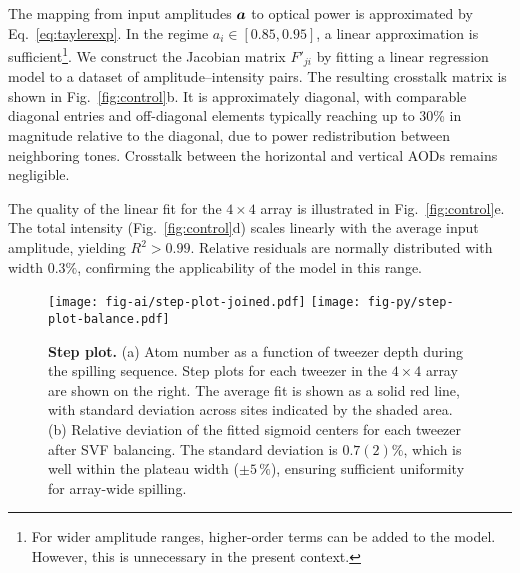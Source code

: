The mapping from input amplitudes $\boldsymbol{a}$ to optical power is approximated by Eq.~\eqref{eq:taylerexp}. In the regime $a_i \in [0.85, 0.95]$, a linear approximation is sufficient\footnote{
    For wider amplitude ranges, higher-order terms can be added to the model. However, this is unnecessary in the present context.
}. We construct the Jacobian matrix $F'_{ji}$ by fitting a linear regression model to a dataset of amplitude–intensity pairs. The resulting crosstalk matrix is shown in Fig.~\ref{fig:control}b. It is approximately diagonal, with comparable diagonal entries and off-diagonal elements typically reaching up to 30\% in magnitude relative to the diagonal, due to power redistribution between neighboring tones. Crosstalk between the horizontal and vertical AODs remains negligible.

The quality of the linear fit for the $4 \times 4$ array is illustrated in Fig.~\ref{fig:control}e. The total intensity (Fig.~\ref{fig:control}d) scales linearly with the average input amplitude, yielding $R^2 > 0.99$. Relative residuals are normally distributed with width $0.3\%$, confirming the applicability of the model in this range.



\begin{figure}
    \centering
    \texttt{[image: fig-ai/step-plot-joined.pdf]}
    \phantom{42}
    \texttt{[image: fig-py/step-plot-balance.pdf]} %
    \caption{
        \textbf{Step plot.}
        (a) 
        Atom number as a function of tweezer depth during the spilling sequence. 
        Step plots for each tweezer in the $4 \times 4$ array are shown on the right. The average fit is shown as a solid red line, with standard deviation across sites indicated by the shaded area. 
        (b) Relative deviation of the fitted sigmoid centers for each tweezer after SVF balancing. The standard deviation is $0.7(2)\%$, which is well within the plateau width ($\pm 5\,\%$), ensuring sufficient uniformity for array-wide spilling. 
    }
    \label{fig:stepplot}
\end{figure}